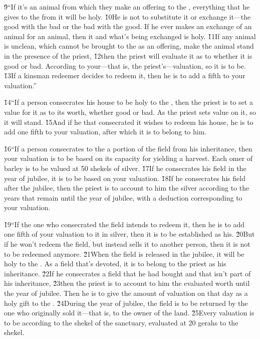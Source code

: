 \v{9}``If it's an animal from which they make an offering to the , everything that he gives to the  from it will be holy. \v{10}He is not to substitute it or exchange it---the good with the bad or the bad with the good. If he ever makes an exchange of an animal for an animal, then it and what's being exchanged is holy. \v{11}If any animal is unclean, which cannot be brought to the  as an offering, make the animal stand in the presence of the priest, \v{12}then the priest will evaluate it as to whether it is good or bad. According to your---that is, the priest's---valuation, so it is to be. \v{13}If a kinsman redeemer decides to redeem it, then he is to add a fifth to your valuation.''

\v{14}``If a person consecrates his house to be holy to the , then the priest is to set a value for it as to its worth, whether good or bad. As the priest sets value on it, so it will stand. \v{15}And if he that consecrated it wishes to redeem his house, he is to add one fifth to your valuation, after which it is to belong to him.

\v{16}``If a person consecrates to the  a portion of the field from his inheritance, then your valuation is to be based on its capacity for yielding a harvest. Each omer of barley is to be valued at 50 shekels of silver. \v{17}If he consecrates his field in the year of jubilee, it is to be based on your valuation. \v{18}If he consecrates his field after the jubilee, then the priest is to account to him the silver according to the years that remain until the year of jubilee, with a deduction corresponding to your valuation.

\v{19}``If the one who consecrated the field intends to redeem it, then he is to add one fifth of your valuation to it in silver, then it is to be established as his. \v{20}But if he won't redeem the field, but instead sells it to another person, then it is not to be redeemed anymore. \v{21}When the field is released in the jubilee, it will be holy to the . As a field that's devoted, it is to belong to the priest as his inheritance. \v{22}If he consecrates a field that he had bought and that isn't part of his inheritance, \v{23}then the priest is to account to him the evaluated worth until the year of jubilee. Then he is to give the amount of valuation on that day as a holy gift to the . \v{24}During the year of jubilee, the field is to be returned by the one who originally sold it---that is, to the owner of the land. \v{25}Every valuation is to be according to the shekel of the sanctuary, evaluated at 20 gerahs to the shekel.

